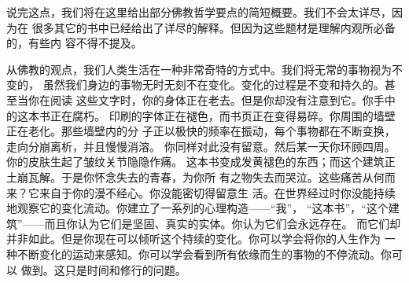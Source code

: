 说完这点，我们将在这里给出部分佛教哲学要点的简短概要。我们不会太详尽，因为在
很多其它的书中已经给出了详尽的解释。但因为这些题材是理解内观所必备的，有些内
容不得不提及。

从佛教的观点，我们人类生活在一种非常奇特的方式中。我们将无常的事物视为不变的，
虽然我们身边的事物无时无刻不在变化。变化的过程是不变和持久的。甚至当你在阅读
这些文字时，你的身体正在老去。但是你却没有注意到它。你手中的这本书正在腐朽。
印刷的字体正在褪色，而书页正在变得易碎。你周围的墙壁正在老化。那些墙壁内的分
子正以极快的频率在振动，每个事物都在不断变换，走向分崩离析，\1并且慢慢消溶。
你同样对此没有留意。然后某一天你环顾四周。你的皮肤生起了皱纹关节隐隐作痛。
这本书变成发黄褪色的东西；而这个建筑正土崩瓦解。于是你怀念失去的青春，为你所
有之物失去而哭泣。这些痛苦从何而来？它来自于你的漫不经心。你没能密切得留意生
活。在世界经过时你没能持续地观察它的变化流动。你建立了一系列的心理构造——“我”，
“这本书”，“这个建筑”——而且你认为它们是坚固、真实的实体。你认为它们会永远存在。
而它们却并非如此。但是你现在可以倾听这个持续的变化。你可以学会将你的人生作为
一种不断变化的运动来感知。你可以学会看到所有依缘而生的事物的不停流动。你可以
做到。这只是时间和修行的问题。


\endchapter

\byebye

